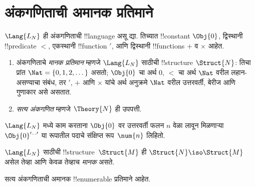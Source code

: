 \documentclass[../../../include/open-logic-section]{subfiles}
\begin{document}
\section{अंकगणिताची अमानक प्रतिमाने}

\begin{defn}
$\Lang{L_N}$ ही अंकगणिताची !!{language} असू द्या. तिच्यात
!!{constant} $\Obj{0}$, द्विस्थानी !!{predicate} $<$,
एकस्थानी !!{function} $\prime$, आणि द्विस्थानी !!{function}s
$+$ व $\times$ आहेत.
\begin{enumerate}
\item अंकगणिताचे \emph{मानक प्रतिमान} म्हणजे $\Lang{L_N}$ साठीची
  !!{structure} $\Struct{N}$: तिचा प्रांत $\Nat = \{ 0, 1, 2, \dots\}$
  असतो; $\Obj{0}$ चा अर्थ $0$, $<$ चा अर्थ $\Nat$ वरील लहान-असण्याचा
  संबंध, तर $\prime$, $+$ आणि $\times$ यांचे अर्थ अनुक्रमे
  $\Nat$ वरील उत्तरवर्ती, बेरीज आणि गुणाकार असे असतात.
\item \emph{सत्य अंकगणित} म्हणजे $\Theory{N}$ ही उपपत्ती.
\end{enumerate}
\end{defn}

$\Lang{L_N}$ मध्ये काम करताना $\Obj{0}$ वर उत्तरवर्ती फलन
$n$ वेळा लावून मिळणाऱ्या $\Obj{0}^{\prime\dots\prime}$
या रूपातील पदाचे संक्षिप्त रूप~$\num{n}$ लिहितो.

\begin{defn}
$\Lang{L_N}$ साठीची !!{structure}~$\Struct{M}$ ही
$\Struct{N} \iso \Struct{M}$ असेल तेव्हा आणि केवळ तेव्हाच
\emph{मानक} असते.
\end{defn}

\begin{thm}
सत्य अंकगणिताची अमानक !!{enumerable} प्रतिमाने आहेत.
\end{thm}
\end{document}
